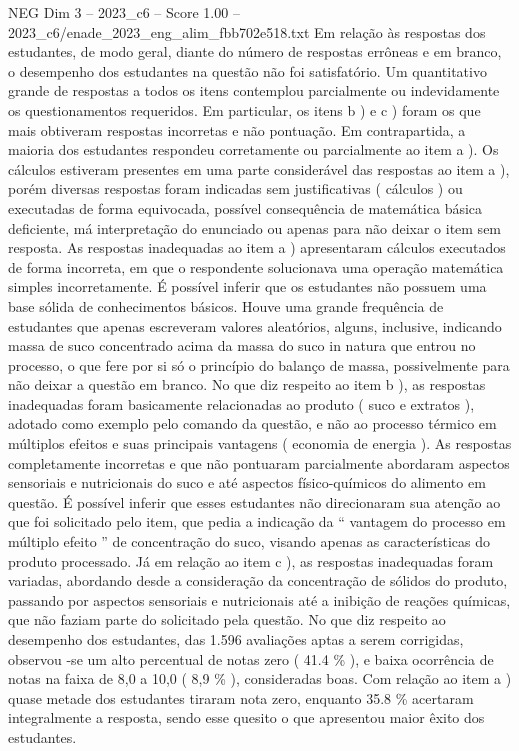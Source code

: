 \begin{textsample}{NEG Dim 3 – 2023\_c6 – Score 1.00 – 2023\_c6/enade\_2023\_eng\_alim\_fbb702e518.txt}
Em relação às respostas dos estudantes, de modo geral, diante do número de respostas errôneas e em branco, o desempenho dos estudantes na questão não foi satisfatório.
Um quantitativo grande de respostas a todos os itens contemplou parcialmente ou indevidamente os questionamentos requeridos.
Em particular, os itens b ) e c ) foram os que mais obtiveram respostas incorretas e não pontuação.
Em contrapartida, a maioria dos estudantes respondeu corretamente ou parcialmente ao item a ).
Os cálculos estiveram presentes em uma parte considerável das respostas ao item a ), porém diversas respostas foram indicadas sem justificativas ( cálculos ) ou executadas de forma equivocada, possível consequência de matemática básica deficiente, má interpretação do enunciado ou apenas para não deixar o item sem resposta.
As respostas inadequadas ao item a ) apresentaram cálculos executados de forma incorreta, em que o respondente solucionava uma operação matemática simples incorretamente.
É possível inferir que os estudantes não possuem uma base sólida de conhecimentos básicos.
Houve uma grande frequência de estudantes que apenas escreveram valores aleatórios, alguns, inclusive, indicando massa de suco concentrado acima da massa do suco in natura que entrou no processo, o que fere por si só o princípio do balanço de massa, possivelmente para não deixar a questão em branco.
No que diz respeito ao item b ), as respostas inadequadas foram basicamente relacionadas ao produto ( suco e extratos ), adotado como exemplo pelo comando da questão, e não ao processo térmico em múltiplos efeitos e suas principais vantagens ( economia de energia ).
As respostas completamente incorretas e que não pontuaram parcialmente abordaram aspectos sensoriais e nutricionais do suco e até aspectos físico-químicos do alimento em questão.
É possível inferir que esses estudantes não direcionaram sua atenção ao que foi solicitado pelo item, que pedia a indicação da “ vantagem do processo em múltiplo efeito ” de concentração do suco, visando apenas as características do produto processado.
Já em relação ao item c ), as respostas inadequadas foram variadas, abordando desde a consideração da concentração de sólidos do produto, passando por aspectos sensoriais e nutricionais até a inibição de reações químicas, que não faziam parte do solicitado pela questão.
No que diz respeito ao desempenho dos estudantes, das 1.596 avaliações aptas a serem corrigidas, observou -se um alto percentual de notas zero ( 41.4 \% ), e baixa ocorrência de notas na faixa de 8,0 a 10,0 ( 8,9 \% ), consideradas boas.
Com relação ao item a ) quase metade dos estudantes tiraram nota zero, enquanto 35.8 \% acertaram integralmente a resposta, sendo esse quesito o que apresentou maior êxito dos estudantes.

\end{textsample}
